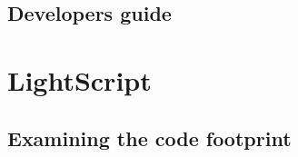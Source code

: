 \documentclass[11pt]{report}
\begin{document}
  \chapter{Developers guide}
\part{LightScript}
  \chapter{Examining the code footprint}

%
%

%
%


\end{document}
